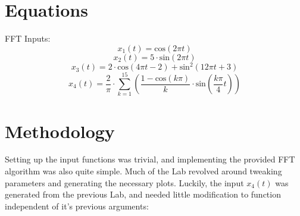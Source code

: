 \documentclass[12pt]{report}
\begin{document}
\section{Equations}
FFT Inputs:
\begin{equation}
    x_{1}(t) = \text{cos}(2\pi t)
\end{equation}
\begin{equation}
    x_{2}(t) = 5\cdot \text{sin}(2\pi t)
\end{equation}
\begin{equation}
    x_{3}(t) = 2\cdot \text{cos}(4\pi t - 2) + \text{sin}^{2}(12\pi t + 3)
\end{equation}
\begin{equation}
    x_{4}(t) = \frac{2}{\pi}\cdot \sum_{k=1}^{15} \left(\frac{1 - \text{cos}(k\pi)}{k}\cdot\text{sin}\left(\frac{k\pi}{4}t\right)\right)
\end{equation}

\pagebreak

\section{Methodology}
Setting up the input functions was trivial, and implementing the provided FFT algorithm was also quite simple. Much of the Lab revolved around tweaking parameters and generating the necessary plots. Luckily, the input $x_4 (t)$ was generated from the previous Lab, and needed little modification to function independent of it's previous arguments:
\end{document}
